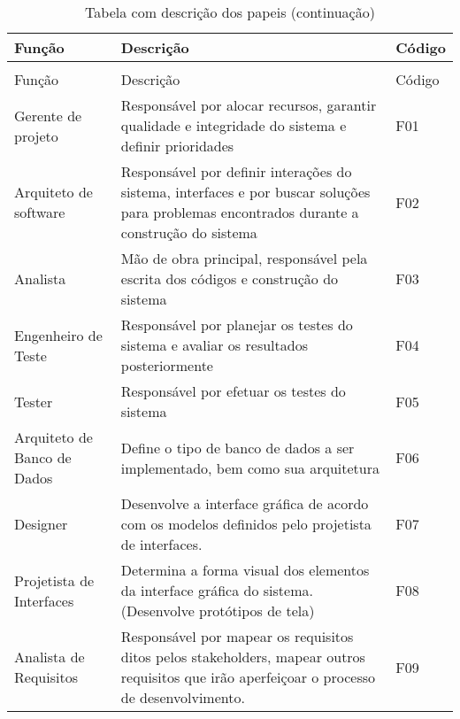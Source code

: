 
\begin{longtable}[c]{|p{13.335em}|p{17.22em}|p{3.335em}|}
  \caption{Tabela com descrição dos papeis\label{tabPapeis}} \\
  \hline
  {Função} & {Descrição} & {Código} \\
  \hline\hline
  \endfirsthead
  \caption[]{Tabela com descrição dos papeis (continuação)} \\
  \hline
  {Função} & {Descrição} & {Código} \\
  \hline\hline
  \endhead
    Gerente de projeto & Responsável por alocar recursos, garantir qualidade e integridade do sistema e definir prioridades & F01 \\
    \midrule
    Arquiteto de software & Responsável por definir interações do sistema, interfaces e por buscar soluções para problemas encontrados durante a construção do sistema & F02 \\
    \midrule
    Analista & Mão de obra principal, responsável pela escrita dos códigos e construção do sistema & F03 \\
    \midrule
    Engenheiro de Teste & Responsável por planejar os testes do sistema e avaliar os resultados posteriormente & F04 \\
    \midrule
    Tester & Responsável por efetuar os testes do sistema & F05 \\
    \midrule
    Arquiteto de Banco de Dados & Define o tipo de banco de dados a ser implementado, bem como sua arquitetura & F06 \\
    \midrule
    Designer & Desenvolve a interface gráfica de acordo com os modelos definidos pelo projetista de interfaces. & F07 \\
    \midrule
    Projetista de Interfaces & Determina a forma visual dos elementos da interface gráfica do sistema. (Desenvolve protótipos de tela) & F08 \\
    \midrule
    Analista de Requisitos & Responsável por mapear os requisitos ditos pelos stakeholders, mapear outros requisitos que irão aperfeiçoar o processo de desenvolvimento. & F09 \\
    \bottomrule
\end{longtable}

